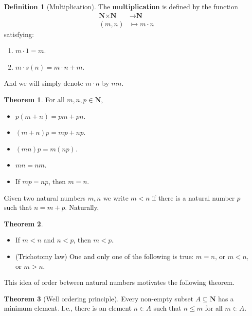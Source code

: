 \documentclass[tikz,12pt,a4paper]{article}
\theoremstyle{definition}
\newtheorem{theorem}{Theorem}[section]
\newtheorem{definition}{Definition}[section]
\begin{document}
\begin{definition}[Multiplication]
	The \textbf{multiplication} is defined by the function
		\begin{equation*}
		\begin{aligned}
			\textbf{N} \times \textbf{N} & \longrightarrow \textbf{N} \\
			(m,n) & \mapsto	m \cdot n
		\end{aligned}
	\end{equation*}
	satisfying:
	\begin{enumerate}
		\item $m \cdot 1 = m$.
		\item $m \cdot s(n) = m \cdot n + m$.
	\end{enumerate}
\end{definition}

And we will simply denote $m \cdot n$ by $mn$.

\begin{theorem}
	For all $m,n,p \in \textbf{N}$,
	\begin{itemize}
		\item $p(m+n) = pm+pn$.
		\item $(m+n)p = mp+np$.
		\item $(mn)p = m(np)$.
		\item $mn = nm$.
		\item If $mp=np$, then $m=n$.
	\end{itemize}
\end{theorem}

Given two natural numbers $m,n$ we write $m < n$ if there is a natural number $p$ such that $n = m+p$. Naturally,

\begin{theorem} \hfill
	\begin{itemize}
		\item If $m<n$ and $n<p$, then $m<p$.
		\item (Trichotomy law) One and only one of the following is true: $m = n$, or $m < n$, or $m>n$.
	\end{itemize}
\end{theorem}

This idea of order between natural numbers motivates the following theorem.

\begin{theorem}[Well ordering principle]
	Every non-empty subset $A \subseteq \textbf{N}$ has a minimum element. I.e., there is an element $n \in A$ such that $n \leq m$ for all $m \in A$.
\end{theorem}
\end{document}
